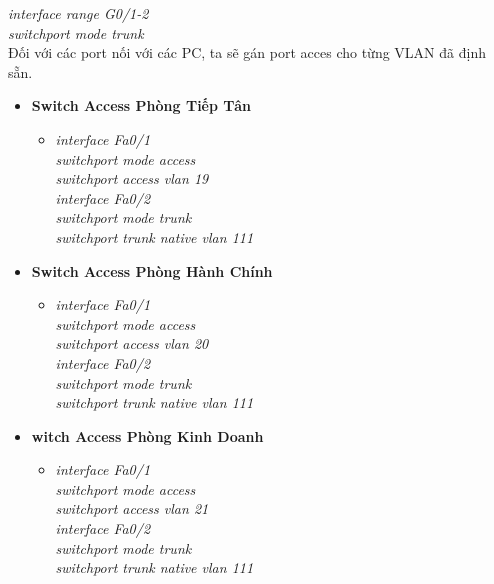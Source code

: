 \documentclass[12pt,a4paper]{report}
\begin{document}
\begin{itemize}
\hspace*{2cm}\textit{interface range G0/1-2\\
\hspace*{2cm}switchport mode trunk\\}
\hspace*{1cm}Đối với các port nối với các PC, ta sẽ gán port acces cho từng VLAN đã định sẵn.
  \begin{itemize}
    \item \textbf{Switch Access Phòng Tiếp Tân}
    \begin{itemize}
      \item \textit{interface Fa0/1\\
switchport mode access\\
switchport access vlan 19 \\
interface Fa0/2\\
switchport mode trunk\\
switchport trunk native vlan 111\\}   
      
    \end{itemize}
   
     \item \textbf{Switch Access Phòng Hành Chính}
     \begin{itemize}
      \item \textit{interface Fa0/1\\
switchport mode access\\
switchport access vlan 20\\
interface Fa0/2\\
switchport mode trunk\\
switchport trunk native vlan 111\\}
     
    \end{itemize}
     \item \textbf{witch Access Phòng Kinh Doanh}
     \begin{itemize}
      \item \textit{interface Fa0/1\\
switchport mode access\\
switchport access vlan 21\\
interface Fa0/2\\
switchport mode trunk\\
switchport trunk native vlan 111\\}
     

\end{itemize}
\end{itemize}
\end{itemize}
\end{document}
